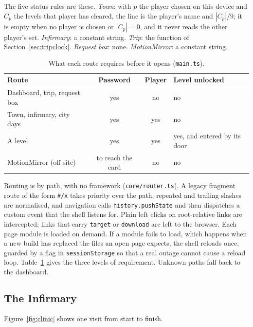 \documentclass[sigconf,nonacm]{acmart}
\newcommand{\code}[1]{\textnormal{\texttt{\small #1}}}
\begin{document}
The five status rules are these. \emph{Town}: with $p$ the player chosen on this device and
$C_p$ the levels that player has cleared, the line is the player's name and
$|C_p|/9$; it is empty when no player is chosen or $|C_p|=0$, and it never reads the other
player's set. \emph{Infirmary}: a constant string. \emph{Trip}: the function of
Section~\ref{sec:tripclock}. \emph{Request box}: none. \emph{MotionMirror}: a constant string.

\begin{table}[t]
  \caption{What each route requires before it opens (\code{main.ts}).}
  \label{tab:routes}
  \small
  \begin{tabular}{@{}p{}ccp{}@{}}
    \toprule
    Route & Password & Player & Level unlocked \\
    \midrule
    Dashboard, trip, request box & yes & no & no \\
    Town, infirmary, city days & yes & yes & no \\
    A level & yes & yes & yes, and entered by its door \\
    MotionMirror (off-site) & to reach the card & no & no \\
    \bottomrule
  \end{tabular}
\end{table}

Routing is by path, with no framework (\code{core/router.ts}). A legacy fragment route of the
form \code{\#/x} takes priority over the path, repeated and trailing slashes are normalised,
and navigation calls \code{history.pushState} and then dispatches a custom event that the
shell listens for. Plain left clicks on root-relative links are intercepted; links that carry
\code{target} or \code{download} are left to the browser. Each page module is loaded on
demand. If a module fails to load, which happens when a new build has replaced the files an
open page expects, the shell reloads once, guarded by a flag in \code{sessionStorage} so that a
real outage cannot cause a reload loop. Table~\ref{tab:routes} gives the three levels of
requirement. Unknown paths fall back to the dashboard.

\subsection{The Infirmary}\label{sec:clinic}
Figure~\ref{fig:clinic} shows one visit from start to finish.
\end{document}
